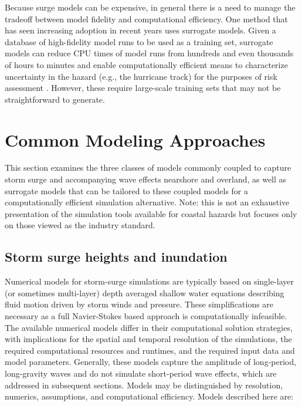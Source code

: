 Because surge models can be expensive, in general there is a need to manage the tradeoff between model fidelity and computational efficiency. One method that has seen increasing adoption in recent years uses surrogate models. Given a database of high-fidelity model runs to be used as a training set, surrogate models can reduce CPU times of model runs from hundreds and even thousands of hours to minutes and enable computationally efficient means to characterize uncertainty in the hazard (e.g., the hurricane track) for the purposes of risk assessment \citep{kijewski-correa2014cybereye}. However, these require large-scale training sets that may not be straightforward to generate. 

\section{Common Modeling Approaches}
\label{sec:storm_surge_methods}

This section examines the three classes of models commonly coupled to capture storm surge and accompanying wave effects nearshore and overland, as well as surrogate models that can be tailored to these coupled models for a computationally efficient simulation alternative. Note: this is not an exhaustive presentation of the simulation tools available for coastal hazards but focuses only on those viewed as the industry standard. 

\subsection{Storm surge heights and inundation}

Numerical models for storm-surge simulations are typically based on single-layer (or sometimes multi-layer) depth averaged shallow water equations describing fluid motion driven by storm winds and pressure. These simplifications are necessary as a full Navier-Stokes based approach is computationally infeasible. The available numerical models differ in their computational solution strategies, with implications for the spatial and temporal resolution of the simulations, the required computational resources and runtimes, and the required input data and model parameters. Generally, these models capture the amplitude of long-period, long-gravity waves and do not simulate short-period wave effects, which are addressed in subsequent sections. Models may be distinguished by resolution, numerics, assumptions, and computational efficiency. Models described here are:

